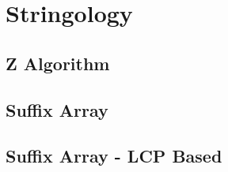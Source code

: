 \section{Stringology}

\subsection{Z Algorithm} 



\subsection{Suffix Array}



\subsection{Suffix Array - LCP Based}

